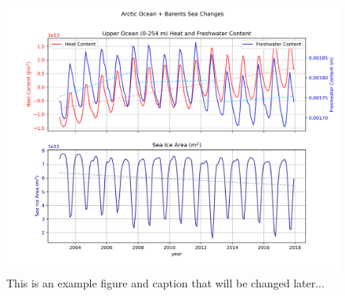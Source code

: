 \documentclass[draft]{agujournal2019}
\begin{document}





\begin{figure}
    \includegraphics[width=\linewidth]{figs/Arctic_timeseries_proposal.png}
    \caption{This is an example figure and caption that will be changed later...}
    \label{fig:timeseries}
\end{figure}
\end{document}

